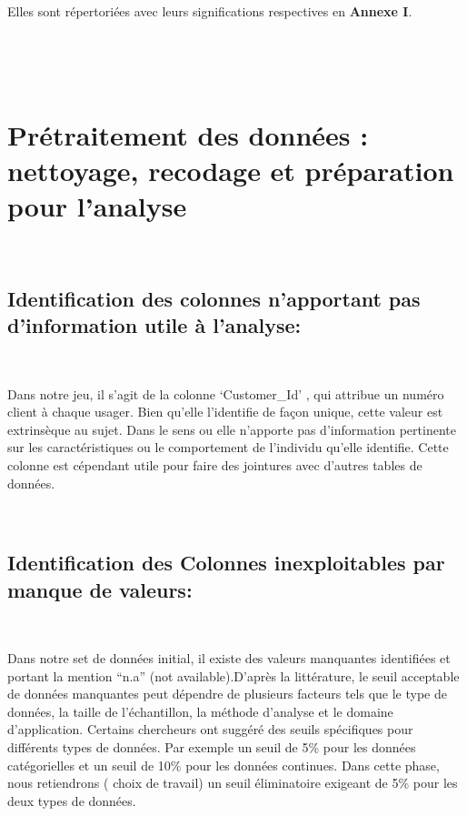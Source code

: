\documentclass[]{imsart}
\numberwithin{equation}{section}
\theoremstyle{plain}
\begin{document}
~

Elles sont répertoriées avec leurs significations respectives en \textbf{Annexe I}.

~

~

\hypertarget{pruxe9traitement-des-donnuxe9es-nettoyage-recodage-et-pruxe9paration-pour-lanalyse}{%
\section{Prétraitement des données : nettoyage, recodage et préparation pour l'analyse}\label{pruxe9traitement-des-donnuxe9es-nettoyage-recodage-et-pruxe9paration-pour-lanalyse}}

~

\hypertarget{identification-des-colonnes-napportant-pas-dinformation-utile-uxe0-lanalyse}{%
\subsection{Identification des colonnes n'apportant pas d'information utile à l'analyse:}\label{identification-des-colonnes-napportant-pas-dinformation-utile-uxe0-lanalyse}}

~

Dans notre jeu, il s'agit de la colonne `Customer\_Id' , qui attribue un numéro client à chaque usager. Bien qu'elle l'identifie de façon unique, cette valeur est extrinsèque au sujet. Dans le sens ou elle n'apporte pas d'information pertinente sur les caractéristiques ou le comportement de l'individu qu'elle identifie. Cette colonne est cépendant utile pour faire des jointures avec d'autres tables de données.

~

\hypertarget{identification-des-colonnes-inexploitables-par-manque-de-valeurs}{%
\subsection{Identification des Colonnes inexploitables par manque de valeurs:}\label{identification-des-colonnes-inexploitables-par-manque-de-valeurs}}

~

Dans notre set de données initial, il existe des valeurs manquantes identifiées et portant la mention ``n.a'' (not available).D'après la littérature, le seuil acceptable de données manquantes peut dépendre de plusieurs facteurs tels que le type de données, la taille de l'échantillon, la méthode d'analyse et le domaine d'application. Certains chercheurs ont suggéré des seuils spécifiques pour différents types de données. Par exemple un seuil de 5\% pour les données catégorielles et un seuil de 10\% pour les données continues. Dans cette phase, nous retiendrons ( choix de travail) un seuil éliminatoire exigeant de 5\% pour les deux types de données.
\end{document}
